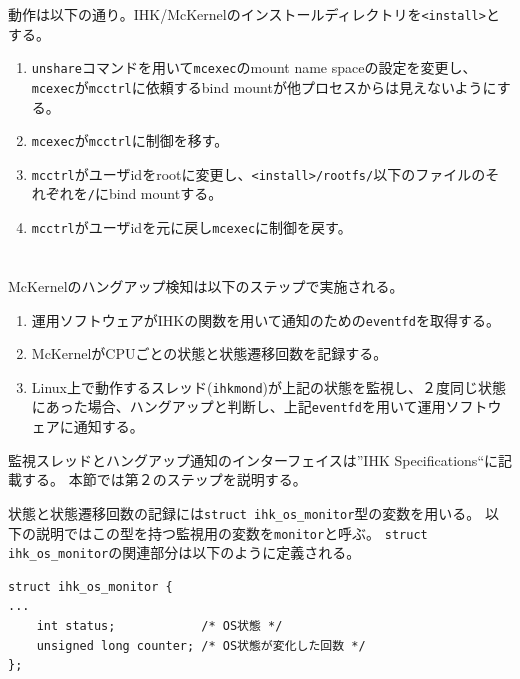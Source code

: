 \documentclass[twoside,11pt,fleqn]{book}
\begin{document}
動作は以下の通り。IHK/McKernelのインストールディレクトリを\texttt{<install>}とする。
\begin{enumerate}
\item \texttt{unshare}コマンドを用いて\texttt{mcexec}のmount name spaceの設定を変更し、\texttt{mcexec}が\texttt{mcctrl}に依頼するbind mountが他プロセスからは見えないようにする。
\item \texttt{mcexec}が\texttt{mcctrl}に制御を移す。
\item \texttt{mcctrl}がユーザidをrootに変更し、\texttt{<install>/rootfs/}以下のファイルのそれぞれを\texttt{/}にbind mountする。
\item \texttt{mcctrl}がユーザidを元に戻し\texttt{mcexec}に制御を戻す。
\end{enumerate}

\section{}
McKernelのハングアップ検知は以下のステップで実施される。
\begin{enumerate}
\item 運用ソフトウェアがIHKの関数を用いて通知のための\texttt{eventfd}を取得する。
\item McKernelがCPUごとの状態と状態遷移回数を記録する。
\item Linux上で動作するスレッド(\texttt{ihkmond})が上記の状態を監視し、２度同じ状態にあった場合、ハングアップと判断し、上記\texttt{eventfd}を用いて運用ソフトウェアに通知する。
\end{enumerate}
監視スレッドとハングアップ通知のインターフェイスは''IHK Specifications``に記載する。
本節では第２のステップを説明する。

状態と状態遷移回数の記録には\texttt{struct ihk\_os\_monitor}型の変数を用いる。
以下の説明ではこの型を持つ監視用の変数を\texttt{monitor}と呼ぶ。
\texttt{struct ihk\_os\_monitor}の関連部分は以下のように定義される。
%
\begin{verbatim}
struct ihk_os_monitor {
...
    int status;            /* OS状態 */
    unsigned long counter; /* OS状態が変化した回数 */
};
\end{verbatim}
\end{document}
